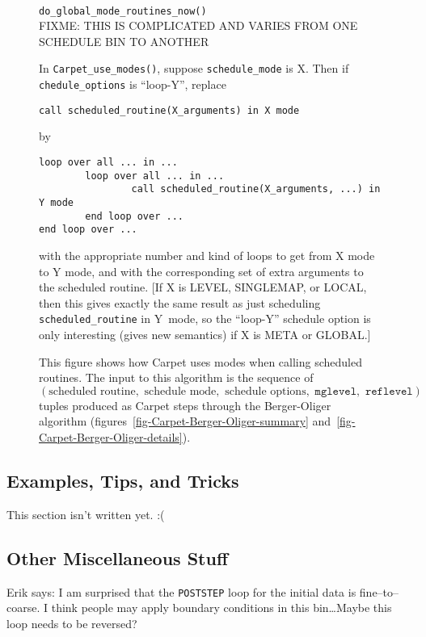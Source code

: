 \documentclass{article}
\begin{document}
\begin{figure}
\begin{tabbing}
  						\\
%
\end{tabbing}
\begin{tabbing}
  \verb|do_global_mode_routines_now()|		\\
FIXME: THIS IS COMPLICATED
       AND VARIES FROM ONE SCHEDULE BIN TO ANOTHER			\\
\end{tabbing}
%
In \verb|Carpet_use_modes()|, suppose \verb|schedule_mode| is X.
Then if \verb|chedule_options| is ``loop-Y'', replace
\begin{verbatim}
call scheduled_routine(X_arguments) in X mode
\end{verbatim}
by
\begin{verbatim}
loop over all ... in ...
        loop over all ... in ...
                call scheduled_routine(X_arguments, ...) in Y mode
        end loop over ...
end loop over ...
\end{verbatim}
with the appropriate number and kind of loops to get from X mode to Y mode,
and with the corresponding set of extra arguments to the scheduled routine.
[If X is LEVEL, SINGLEMAP, or LOCAL, then this gives exactly the same
result as just scheduling \verb|scheduled_routine| in Y~mode, so the
``loop-Y'' schedule option is only interesting (gives new semantics)
if X is META or GLOBAL.]
\caption[How Carpet uses Modes when Calling Scheduled Routines]
	{
	This figure shows how Carpet uses modes when calling
	scheduled routines.  The input to this algorithm is the
	sequence of
	$(\textrm{scheduled routine},\,\,
	  \textrm{schedule mode},\,\, \textrm{schedule options},\,\,
	  \texttt{mglevel},\,\, \texttt{reflevel})$
	tuples produced as Carpet steps through the Berger-Oliger
	algorithm (figures~\protect\ref{fig-Carpet-Berger-Oliger-summary}
	and~\protect\ref{fig-Carpet-Berger-Oliger-details}).
	}
\label{fig-how-Carpet-uses-modes}
\end{figure}


\subsection{Examples, Tips, and Tricks}

This section isn't written yet. :(


\subsection{Other Miscellaneous Stuff}

Erik says:
I am surprised that the \verb|POSTSTEP| loop for the initial data is
fine--to--coarse.  I think people may apply boundary conditions in
this bin\ldots Maybe this loop needs to be reversed?




\end{document}
